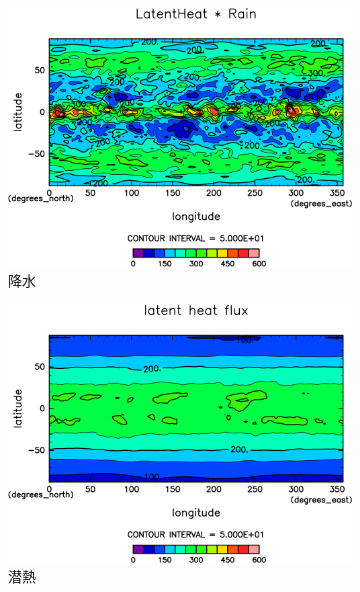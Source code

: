 \documentclass[body]{subfiles}
\begin{document}
\begin{figure}[t]
\begin{subfigure}{.4\textwidth}
		\includegraphics[width=\textwidth]{S1500-nc/Rain,time=3650:4015-crop-rotate.pdf}
		\caption{降水\hmu*{[W/m^{-2}]}}\label{S1500nc降水}
	\end{subfigure}
	\begin{subfigure}{.4\textwidth}
		\centering
		\includegraphics[width=\textwidth]{S1500-nc/Evap,time=3650:4015-crop-rotate.pdf}
		\caption{潜熱\hmu*{[W/m^{-2}]}}\label{S1500nc潜熱}
	\end{subfigure}
	\begin{subfigure}{.4\textwidth}
		\centering

\end{subfigure}
\end{figure}
\end{document}

